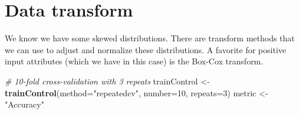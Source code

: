 \documentclass[]{book}
\newenvironment{Shaded}{\begin{snugshade}}{\end{snugshade}}
\newcommand{\CommentTok}[1]{\textcolor[rgb]{0.56,0.35,0.01}{\textit{#1}}}
\newcommand{\DataTypeTok}[1]{\textcolor[rgb]{0.13,0.29,0.53}{#1}}
\newcommand{\DecValTok}[1]{\textcolor[rgb]{0.00,0.00,0.81}{#1}}
\newcommand{\KeywordTok}[1]{\textcolor[rgb]{0.13,0.29,0.53}{\textbf{#1}}}
\newcommand{\NormalTok}[1]{#1}
\newcommand{\StringTok}[1]{\textcolor[rgb]{0.31,0.60,0.02}{#1}}
\begin{document}
\hypertarget{data-transform}{%
\section{Data transform}\label{data-transform}}

We know we have some skewed distributions. There are transform methods that we can use to adjust and normalize these distributions. A favorite for positive input attributes (which we have in this case) is the Box-Cox transform.

\begin{Shaded}
\begin{Highlighting}[]
\CommentTok{# 10-fold cross-validation with 3 repeats}
\NormalTok{trainControl <-}\StringTok{ }\KeywordTok{trainControl}\NormalTok{(}\DataTypeTok{method=}\StringTok{"repeatedcv"}\NormalTok{, }\DataTypeTok{number=}\DecValTok{10}\NormalTok{, }\DataTypeTok{repeats=}\DecValTok{3}\NormalTok{)}
\NormalTok{metric <-}\StringTok{ "Accuracy"}


\end{Highlighting}
\end{Shaded}
\end{document}
